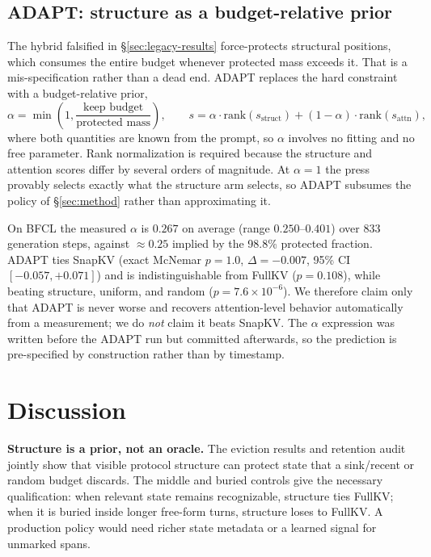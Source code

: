 \documentclass[10pt]{article}
\begin{document}
\subsection{ADAPT: structure as a budget-relative prior}
\label{sec:external-adapt}

The hybrid falsified in \S\ref{sec:legacy-results} force-protects structural
positions, which consumes the entire budget whenever protected mass exceeds it.
That is a mis-specification rather than a dead end.  ADAPT replaces the hard
constraint with a budget-relative prior,
\begin{equation}
  \alpha = \min\!\left(1, \frac{\text{keep budget}}{\text{protected mass}}\right),
  \qquad
  s = \alpha \cdot \mathrm{rank}(s_{\text{struct}}) + (1-\alpha)\cdot
      \mathrm{rank}(s_{\text{attn}}),
  \label{eq:adapt}
\end{equation}
where both quantities are known from the prompt, so $\alpha$ involves no fitting
and no free parameter.  Rank normalization is required because the structure and
attention scores differ by several orders of magnitude.  At $\alpha=1$ the press
provably selects exactly what the structure arm selects, so ADAPT subsumes the
policy of \S\ref{sec:method} rather than approximating it.

On BFCL the measured $\alpha$ is $0.267$ on average (range $0.250$--$0.401$) over
833 generation steps, against $\approx 0.25$ implied by the 98.8\% protected
fraction.  ADAPT ties SnapKV (exact McNemar $p=1.0$, $\Delta=-0.007$, 95\% CI
$[-0.057, +0.071]$) and is indistinguishable from FullKV ($p=0.108$), while
beating structure, uniform, and random ($p=7.6\times10^{-6}$).  We therefore
claim only that ADAPT is never worse and recovers attention-level behavior
automatically from a measurement; we do \emph{not} claim it beats SnapKV.  The
$\alpha$ expression was written before the ADAPT run but committed afterwards, so
the prediction is pre-specified by construction rather than by timestamp.

\section{Discussion}
\label{sec:discussion}

\textbf{Structure is a prior, not an oracle.}
The eviction results and retention audit jointly show that visible protocol structure can
protect state that a sink/recent or random budget discards.  The middle and
buried controls give the necessary qualification: when relevant state remains
recognizable, structure ties FullKV; when it is buried inside longer free-form
turns, structure loses to FullKV.  A production policy would need richer state
metadata or a learned signal for unmarked spans.
\end{document}
